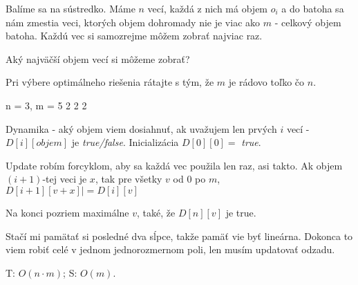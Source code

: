 
Balíme sa na sústredko. Máme $n$ vecí, každá z nich má objem $o_i$ a do batoha
sa nám zmestia veci, ktorých objem dohromady nie je viac ako $m$ - celkový objem batoha.
Každú vec si samozrejme môžem zobrať najviac raz.

Aký najväčší objem vecí si môžeme zobrať?

Pri výbere optimálneho riešenia rátajte s tým, že $m$ je rádovo toľko čo $n$.

\vstup
n = 3, m = 5
2 2 2


\koniec

Dynamika - aký objem viem dosiahnuť, ak uvažujem len prvých $i$ vecí - $D[i][objem]$ je \emph{true/false}.
Inicializácia $D[0][0] =$ \emph{true}.

Update robím forcyklom, aby sa každá vec použila len raz, asi takto. Ak objem $(i+1)$-tej
veci je $x$, tak pre všetky $v$ od $0$ po $m$,
$D[i+1][v+x] |= D[i][v]$

Na konci pozriem maximálne $v$, také, že $D[n][v]$ je true.

Stačí mi pamätať si posledné dva sĺpce, takže pamäť vie byť lineárna.
Dokonca to viem robiť celé v jednom jednorozmernom poli, len musím updatovať odzadu.

T: $O(n \cdot m)$; S: $O(m)$.
